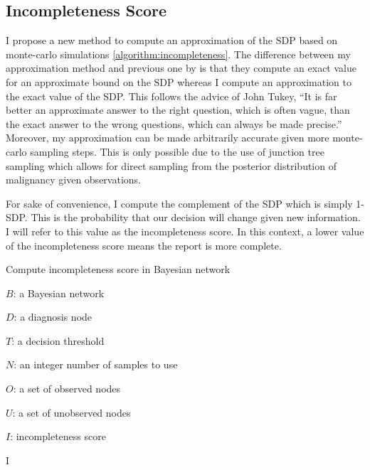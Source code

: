 \subsection{Incompleteness Score}
I propose a new method to compute an approximation of the SDP based on monte-carlo simulations \ref{algorithm:incompleteness}. The difference between my approximation method and previous one by  is that they compute an exact value for an approximate bound on the SDP whereas I compute an approximation to the exact value of the SDP. This follows the advice of John Tukey, ``It is far better an approximate answer to the right question, which is often vague, than the exact answer to the wrong questions, which can always be made precise.'' \cite{Tukey:1962vw} Moreover, my approximation can be made arbitrarily accurate given more monte-carlo sampling steps. This is only possible due to the use of junction tree sampling which allows for direct sampling from the posterior distribution of malignancy given observations.

For sake of convenience, I compute the complement of the SDP which is simply 1-SDP. This is the probability that our decision will change given new information. I will refer to this value as the incompleteness score. In this context, a lower value of the incompleteness score means the report is more complete.


\begin{algorithm}[h]
	\caption{Compute incompleteness score in Bayesian network}
	\label{algorithm:incompleteness}
	\begin{algorithmic}
		\Require
		
		$ B $: a Bayesian network
		
		$ D $: a diagnosis node
		
		$ T $: a decision threshold
		
		$ N $: an integer number of samples to use
		
		$ O $: a set of observed nodes
		
		$ U $: a set of unobserved nodes
		
		\Ensure $ I $: incompleteness score
		
		
		
		
			
			
			\EndIf
		\EndFor
		\State \Return I
		\EndFunction
		
	\end{algorithmic}
\end{algorithm}

